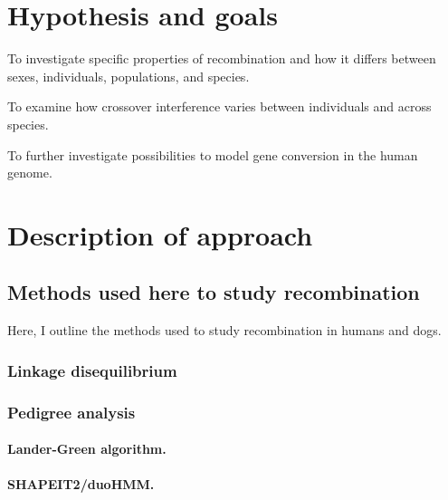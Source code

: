 \section{Hypothesis and goals}

\begin{titemize}
    \item To investigate specific properties of recombination and how it differs between sexes, individuals, populations, and species.
    \item To examine how crossover interference varies between individuals and across species.
    \item To further investigate possibilities to model gene conversion in the human genome.
\end{titemize}

\section{Description of approach}

\subsection{Methods used here to study recombination}
Here, I outline the methods used to study recombination in humans and dogs.

\subsubsection{Linkage disequilibrium}


\subsubsection{Pedigree analysis}

\paragraph{Lander-Green algorithm.}
\paragraph{SHAPEIT2/duoHMM.}

